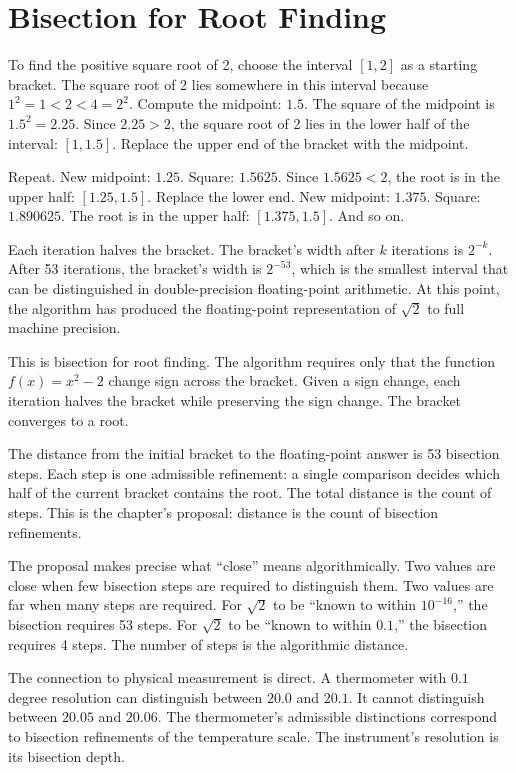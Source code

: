 \section{Bisection for Root Finding}
\label{se:bisection-for-root-finding}

To find the positive square root of 2, choose the interval $[1, 2]$ as a
starting bracket. The square root of 2 lies somewhere in this interval
because $1^2 = 1 < 2 < 4 = 2^2$. Compute the midpoint: $1.5$. The square
of the midpoint is $1.5^2 = 2.25$. Since $2.25 > 2$, the square root of
2 lies in the lower half of the interval: $[1, 1.5]$. Replace the upper
end of the bracket with the midpoint.

Repeat. New midpoint: $1.25$. Square: $1.5625$. Since $1.5625 < 2$,
the root is in the upper half: $[1.25, 1.5]$. Replace the lower end.
New midpoint: $1.375$. Square: $1.890625$. The root is in the upper
half: $[1.375, 1.5]$. And so on.

Each iteration halves the bracket. The bracket's width after $k$
iterations is $2^{-k}$. After 53 iterations, the bracket's width is
$2^{-53}$, which is the smallest interval that can be distinguished in
double-precision floating-point arithmetic. At this point, the
algorithm has produced the floating-point representation of $\sqrt{2}$
to full machine precision.

This is bisection for root finding. The algorithm requires only that
the function $f(x) = x^2 - 2$ change sign across the bracket. Given a
sign change, each iteration halves the bracket while preserving the
sign change. The bracket converges to a root.

The distance from the initial bracket to the floating-point answer is
53 bisection steps. Each step is one admissible refinement: a single
comparison decides which half of the current bracket contains the root.
The total distance is the count of steps. This is the chapter's
proposal: distance is the count of bisection refinements.

The proposal makes precise what ``close'' means algorithmically. Two
values are close when few bisection steps are required to distinguish
them. Two values are far when many steps are required. For $\sqrt{2}$
to be ``known to within $10^{-16}$,'' the bisection requires 53 steps.
For $\sqrt{2}$ to be ``known to within $0.1$,'' the bisection requires
4 steps. The number of steps is the algorithmic distance.

The connection to physical measurement is direct. A thermometer with
$0.1$ degree resolution can distinguish between $20.0$ and $20.1$. It
cannot distinguish between $20.05$ and $20.06$. The thermometer's
admissible distinctions correspond to bisection refinements of the
temperature scale. The instrument's resolution is its bisection
depth.

